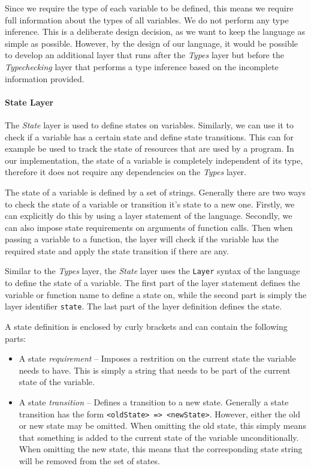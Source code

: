 Since we require the type of each variable to be defined, this means we require full information about the types of all variables. We do not perform any type inference. This is a deliberate design decision, as we want to keep the language as simple as possible. However, by the design of our language, it would be possible to develop an additional layer that runs after the \textit{Types} layer but before the \textit{Typechecking} layer that performs a type inference based on the incomplete information provided.

\paragraph{State Layer}

The \textit{State} layer is used to define states on variables. Similarly, we can use it to check if a variable has a certain state and define state transitions. This can for example be used to track the state of resources that are used by a program. In our implementation, the state of a variable is completely independent of its type, therefore it does not require any dependencies on the \textit{Types} layer.

The state of a variable is defined by a set of strings. Generally there are two ways to check the state of a variable or transition it's state to a new one. Firstly, we can explicitly do this by using a layer statement of the language. Secondly, we can also impose state requirements on arguments of function calls. Then when passing a variable to a function, the layer will check if the variable has the required state and apply the state transition if there are any.

Similar to the \textit{Types} layer, the \textit{State} layer uses the \texttt{Layer} syntax of the language to define the state of a variable. The first part of the layer statement defines the variable or function name to define a state on, while the second part is simply the layer identifier \texttt{state}. The last part of the layer definition defines the state.

A state definition is enclosed by curly brackets and can contain the following parts:

\begin{itemize}
	\item A state \textit{requirement} -- Imposes a restrition on the current state the variable needs to have. This is simply a string that needs to be part of the current state of the variable.
	\item A state \textit{transition} -- Defines a transition to a new state. Generally a state transition has the form \texttt{<oldState> => <newState>}. However, either the old or new state may be omitted. When omitting the old state, this simply means that something is added to the current state of the variable unconditionally. When omitting the new state, this means that the corresponding state string will be removed from the set of states.
\end{itemize}

